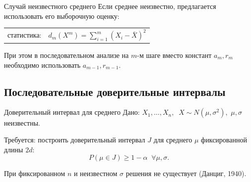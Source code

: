 \documentclass[9pt,pdf,utf8,hyperref={unicode},aspectratio=169]{beamer}
\renewcommand{\geq}{\geqslant}
\begin{document}
\begin{frame}{Случай неизвестного среднего}
    Если среднее неизвестно, предлагается использовать его выборочную оценку:
    \begin{center}
        \begin{tabular}{rl}
            статистика:                     & $d_m\left(X^{m}\right) = \sum\limits_{i=1}^m \left(X_{i}-\bar{X}\right)^2$ \\
        \end{tabular}
    \end{center}

    При этом в последовательном анализе на $m$-м шаге вместо констант $a_m, r_m$ необходимо использовать $a_{m-1}, r_{m-1}$.
\end{frame}


\subsection{Последовательные доверительные интервалы}
\begin{frame}{Доверительный интервал для среднего}
    Дано: $X_1,\dots,X_n, \;\; X\sim N\left(\mu, \sigma^2\right),$ \; $\mu, \sigma$ неизвестны.
    
    \bigskip
    
    Требуется: построить доверительный интервал $J$ для среднего $\mu$ фиксированной длины $2d$: $$P\left(\mu\in J\right)\geq 1-\alpha \;\; \forall \mu, \sigma.$$    
    
    \bigskip
    
    При фиксированном $n$ и неизвестном $\sigma$ решения не существует (Данциг, 1940).
\end{frame}
\end{document}
